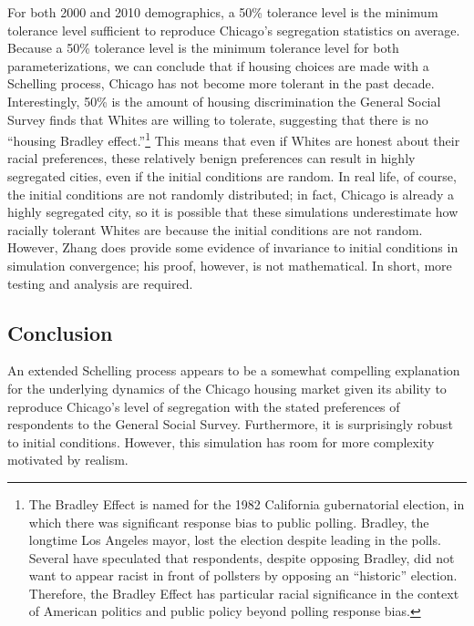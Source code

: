 \documentclass[11pt]{asaproc}
\newcommand{\1}{\mathbb{1}}
\begin{document}
For both 2000 and 2010 demographics, a 50\% tolerance level is the minimum tolerance level sufficient to reproduce Chicago's segregation statistics on average. Because a 50\% tolerance level is the minimum tolerance level for both parameterizations, we can conclude that if housing choices are made with a Schelling process, Chicago has not become more tolerant in the past decade. Interestingly, 50\% is the amount of housing discrimination the General Social Survey finds that Whites are willing to tolerate, suggesting that there is no ``housing Bradley effect.''\footnote{The Bradley Effect is named for the 1982 California gubernatorial election, in which there was significant response bias to public polling. Bradley, the longtime Los Angeles mayor, lost the election despite leading in the polls. Several have speculated that respondents, despite opposing Bradley, did not want to appear racist in front of pollsters by opposing an ``historic'' election. Therefore, the Bradley Effect has particular racial significance in the context of American politics and public policy beyond polling response bias.} This means that even if Whites are honest about their racial preferences, these relatively benign preferences can result in highly segregated cities, even if the initial conditions are random. In real life, of course, the initial conditions are not randomly distributed; in fact, Chicago is already a highly segregated city, so it is possible that these simulations underestimate how racially tolerant Whites are because the initial conditions are not random. However, Zhang does provide some evidence of invariance to initial conditions in simulation convergence; his proof, however, is not mathematical. In short, more testing and analysis are required.

\subsection{Conclusion}

An extended Schelling process appears to be a somewhat compelling explanation for the underlying dynamics of the Chicago housing market given its ability to reproduce Chicago's level of segregation with the stated preferences of respondents to the General Social Survey. Furthermore, it is surprisingly robust to initial conditions. However, this simulation has room for more complexity motivated by realism.
\end{document}
